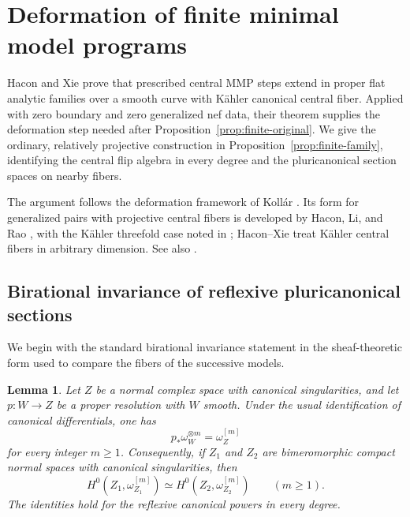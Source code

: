 \documentclass[11pt,a4paper]{article}
\newtheorem{lemma}[theorem]{Lemma}
\theoremstyle{definition}\newtheorem{definition}[theorem]{Definition}
\theoremstyle{remark}\newtheorem*{remark}{Remark}
\begin{document}
\section{Deformation of finite minimal model programs}
\label{sec:family-program}

Hacon and Xie \cite[Theorem~7.7]{HX2026} prove that prescribed
central MMP steps extend in proper flat analytic families over a smooth
curve with Kähler canonical central fiber.
Applied with zero boundary and zero generalized nef
data, their theorem supplies the deformation step needed after
Proposition~\ref{prop:finite-original}.
We give the ordinary, relatively projective construction in
Proposition~\ref{prop:finite-family}, identifying the central flip
algebra in every degree and the pluricanonical section spaces on
nearby fibers.

The argument follows the deformation framework of Kollár
\cite[paragraph~8]{Kollar2021}. Its form for generalized pairs with
projective central fibers is developed by Hacon, Li, and Rao
\cite[Proposition~4.16]{HLR2026}, with the Kähler threefold case
noted in \cite[Remark~4.17]{HLR2026}; Hacon--Xie treat
Kähler central fibers in arbitrary dimension. See also
\cite[Theorem~2.28]{FLR2026}.

\subsection{Birational invariance of reflexive pluricanonical sections}

We begin with the standard birational invariance statement in the
sheaf-theoretic form used to compare the fibers of the successive models.

\begin{lemma}\label{lem:canonical-birational}
Let $Z$ be a normal complex space with canonical singularities, and let
$p:W\to Z$ be a proper resolution with $W$ smooth. Under the usual
identification of canonical differentials, one has
\begin{equation}\label{eq:canonical-resolution-sections}
 p_*\omega_W^{\otimes m}=\omega_Z^{[m]}
\end{equation}
for every integer $m\ge1$. Consequently, if $Z_1$ and $Z_2$ are
bimeromorphic compact normal spaces with canonical singularities, then
\begin{equation}\label{eq:canonical-birational-H0}
 H^0(Z_1,\omega_{Z_1}^{[m]})
 \simeq H^0(Z_2,\omega_{Z_2}^{[m]})
 \qquad(m\ge1).
\end{equation}
The identities hold for the reflexive canonical powers in every degree.
\end{lemma}
\end{document}
